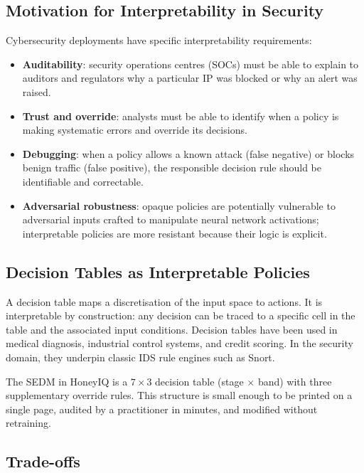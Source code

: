 \subsection{Motivation for Interpretability in Security}

Cybersecurity deployments have specific interpretability requirements:
%
\begin{itemize}
  \item \textbf{Auditability}: security operations centres (SOCs) must be
        able to explain to auditors and regulators why a particular IP was
        blocked or why an alert was raised.
  \item \textbf{Trust and override}: analysts must be able to identify when
        a policy is making systematic errors and override its decisions.
  \item \textbf{Debugging}: when a policy allows a known attack (false
        negative) or blocks benign traffic (false positive), the responsible
        decision rule should be identifiable and correctable.
  \item \textbf{Adversarial robustness}: opaque policies are potentially
        vulnerable to adversarial inputs crafted to manipulate neural network
        activations; interpretable policies are more resistant because their
        logic is explicit.
\end{itemize}

\subsection{Decision Tables as Interpretable Policies}

A decision table maps a discretisation of the input space to actions.
It is interpretable by construction: any decision can be traced to a
specific cell in the table and the associated input conditions.
Decision tables have been used in medical diagnosis, industrial control
systems, and credit scoring.
In the security domain, they underpin classic IDS rule engines such as Snort.

The SEDM in HoneyIQ is a $7 \times 3$ decision table (stage $\times$ band)
with three supplementary override rules.
This structure is small enough to be printed on a single page, audited by
a practitioner in minutes, and modified without retraining.

\subsection{Trade-offs}

